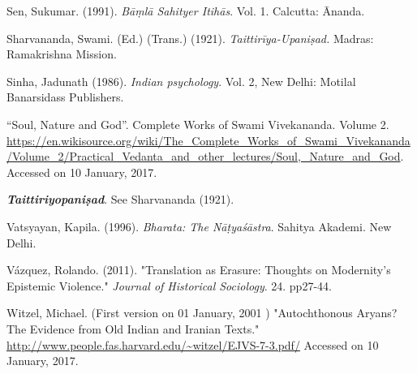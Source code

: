 \begin{thebibliography}{99}
Sen, Sukumar. (1991). \textsl{Bāṃlā Sahityer Itihās}. Vol. 1. Calcutta: Ānanda. 

Sharvananda, Swami. (Ed.) (Trans.) (1921). \textsl{Taittirīya-Upaniṣad.} Madras: Ramakrishna Mission.

Sinha, Jadunath (1986). \textsl{Indian psychology}. Vol. 2, New Delhi: Motilal Banarsidass Publishers.

“Soul, Nature and God”. Complete Works of Swami Vivekananda. Volume 2. \url{https://en.wikisource.org/wiki/The_Complete_Works_of_Swami_Vivekananda/Volume_2/Practical_Vedanta_and_other_lectures/Soul,_Nature_and_God}. Accessed on 10 January, 2017. 

{\sl\bfseries Taittiriyopaniṣad}. See Sharvananda (1921).

Vatsyayan, Kapila. (1996). \textsl{Bharata: The Nāṭyaśāstra}. Sahitya Akademi. New Delhi. 

Vázquez, Rolando. (2011). "Translation as Erasure: Thoughts on Modernity's Epistemic Violence." \textsl{Journal of Historical Sociology}. 24. pp27-44.

Witzel, Michael. (First version on 01 January, 2001 ) "Autochthonous Aryans? The Evidence from Old Indian and Iranian Texts." \url{http://www.people.fas.harvard.edu/~witzel/EJVS-7-3.pdf/} Accessed on 10 January, 2017. 
\end{thebibliography}
